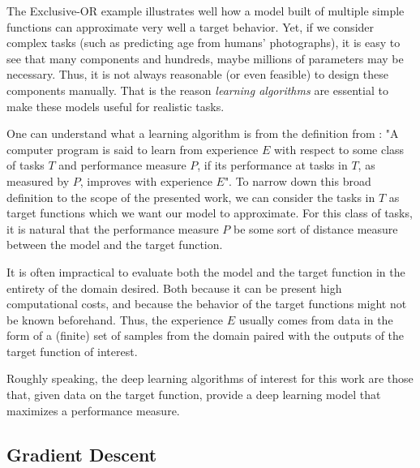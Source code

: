 The Exclusive-OR example illustrates well how a model built of multiple simple functions can approximate very well a target behavior.
Yet, if we consider complex tasks (such as predicting age from humans' photographs), it is easy to see that many components and hundreds, maybe millions of parameters may be necessary\footnotemark.
Thus, it is not always reasonable (or even feasible) to design these components manually.
That is the reason \textit{learning algorithms} are essential to make these models useful for realistic tasks.


One can understand what a learning algorithm is from the definition from \textcite{mitchell_machine_1997}:
"A computer program is said to learn from experience $E$ with respect to some class of tasks $T$ and performance measure $P$, if its performance at tasks in $T$, as measured by $P$, improves with experience $E$".
To narrow down this broad definition to the scope of the presented work, we can consider the tasks in $T$ as target functions which we want our model to approximate.
For this class of tasks, it is natural that the performance measure $P$ be some sort of distance measure between the model and the target function.

It is often impractical to evaluate both the model and the target function in the entirety of the domain desired.
Both because it can be present high computational costs, and because the behavior of the target functions might not be known beforehand.
Thus, the experience $E$ usually comes from data in the form of a (finite) set of samples from the domain paired with the outputs of the target function of interest.

Roughly speaking, the deep learning algorithms of interest for this work are those that, given data on the target function, provide a deep learning model that maximizes a performance measure.

\subsection{Gradient Descent}


